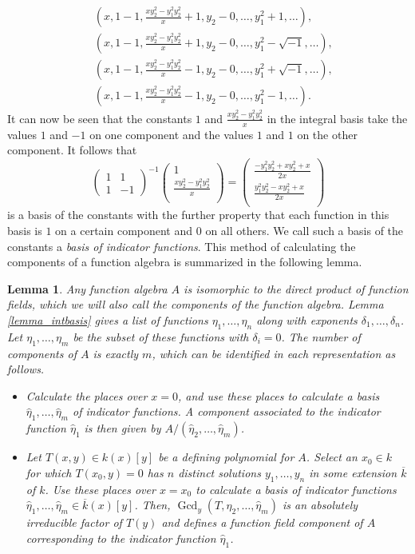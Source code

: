 \documentclass[12pt,reqno]{amsart}
\numberwithin{equation}{section}
\newtheorem{lemma}[theorem]{Lemma}
\newcommand{\mat}[4]  { \left(\begin{array}{cc} #1 & #2 \\ #3 & #4 \end{array} \right)}
\newcommand{\op}[1]  { \operatorname{ #1 }}
\begin{document}
\begin{align*}
&(x,1-1,\frac{x y_2^2-y_1^2 y_2^2}{x}+1,y_2-0,\dots,y_1^2+1,\dots)\text{,}\\
&(x,1-1,\frac{x y_2^2-y_1^2 y_2^2}{x}+1,y_2-0,\dots,y_1^2-\sqrt{-1},\dots)\text{,}\\
&(x,1-1,\frac{x y_2^2-y_1^2 y_2^2}{x}-1,y_2-0,\dots,y_1^2+\sqrt{-1},\dots)\text{,}\\
&(x,1-1,\frac{x y_2^2-y_1^2 y_2^2}{x}-1,y_2-0,\dots,y_1^2-1,\dots)\text{.}
\end{align*}
It can now be seen that the constants $1$ and $\frac{x y_2^2-y_1^2 y_2^2}{x}$ in the integral basis take the values $1$ and $-1$ on one component and the values $1$ and $1$ on the other component. It follows that
\begin{equation*}
\mat{1}{1}{1}{-1}^{-1} \left(
\begin{array}{c}
 1 \\
 \frac{x y_2^2-y_1^2 y_2^2}{x} \\
\end{array}
\right) = \left(
\begin{array}{c}
 \frac{-y_1^2 y_2^2+x y_2^2+x}{2 x} \\
 \frac{y_1^2 y_2^2-x y_2^2+x}{2 x} \\
\end{array}
\right) 
\end{equation*}
is a basis of the constants with the further property that each function in this basis is $1$ on a certain component and $0$ on all others. We call such a basis of the constants a \emph{basis of indicator functions}. This method of calculating the components of a function algebra is summarized in the following lemma.
\begin{lemma}
Any function algebra $A$ is isomorphic to the direct product of function fields, which we will also call the components of the function algebra. Lemma \ref{lemma_intbasis} gives a list of functions $\eta_1, \dots, \eta_n$ along with exponents $\delta_1, \dots, \delta_n$. Let $\eta_1, \dots, \eta_m$ be the subset of these functions with $\delta_i=0$. The number of components of $A$ is exactly $m$, which can be identified in each representation as follows.
\begin{itemize}
\item[(M)] Calculate the places over $x=0$, and use these places to calculate a basis $\hat{\eta}_1, \dots, \hat{\eta}_m$ of indicator functions. A component associated to the indicator function $\hat{\eta}_1$ is then given by $A/(\hat{\eta}_2,\dots,\hat{\eta}_m)$.

\item[(P)] Let $T(x,y) \in k(x)[y]$ be a defining polynomial for $A$. Select an $x_0 \in k$ for which $T(x_0,y)=0$ has $n$ distinct solutions $y_1,\dots,y_n$ in some extension $\overline{k}$ of $k$. Use these places over $x=x_0$ to calculate a basis of indicator functions $\hat{\eta}_1, \dots, \hat{\eta}_m \in \overline{k}(x)[y]$. Then, $\op{Gcd}_{y} (T, \hat{\eta}_2, \dots, \hat{\eta}_m)$ is an absolutely irreducible factor of $T(y)$ and defines a function field component of $A$ corresponding to the indicator function $\hat{\eta}_1$.
\end{itemize}
\end{lemma}
\end{document}
